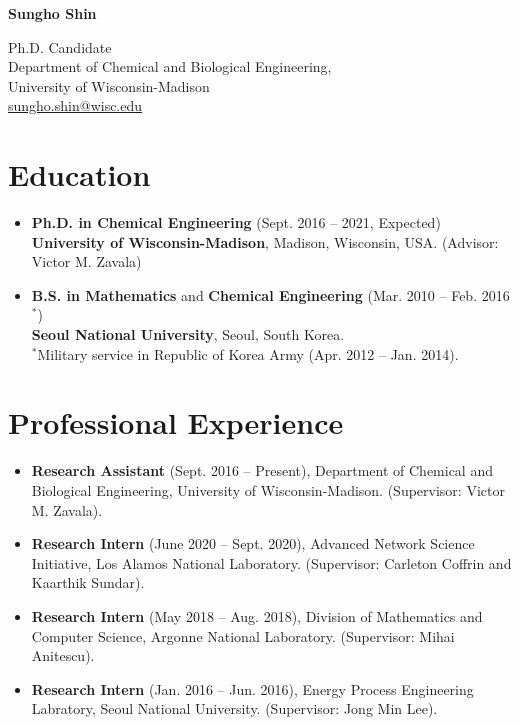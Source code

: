 \documentclass{article}
\begin{document}
\begin{center}
  {\bf\LARGE Sungho Shin}
\end{center}
\begin{center}
  {Ph.D. Candidate}\\
  {Department of Chemical and Biological Engineering},\\
  {University of Wisconsin-Madison}\\
  \href{mailto:sungho.shin@wisc.edu}{sungho.shin@wisc.edu}
\end{center}

\section*{Education}
\begin{itemize}[leftmargin=*]
\item[]{\bf Ph.D. in Chemical Engineering} (Sept. 2016 -- 2021, Expected)\\
  {\bf University of Wisconsin-Madison}, Madison, Wisconsin, USA. (Advisor: Victor M. Zavala)
\item[]{\bf B.S. in Mathematics} and {\bf Chemical Engineering} (Mar. 2010 -- Feb. 2016$^*$)\\
  {\bf Seoul National University}, Seoul, South Korea.\\
  $^*$Military service in Republic of Korea Army (Apr. 2012 -- Jan. 2014).
\end{itemize}

\section*{Professional Experience}
\begin{itemize}[leftmargin=*]
\item[] {\bf Research Assistant} (Sept. 2016 -- Present), Department of Chemical and Biological Engineering, University of Wisconsin-Madison. (Supervisor: Victor M. Zavala).
\item[] {\bf Research Intern} (June 2020 -- Sept. 2020), Advanced Network Science Initiative, Los Alamos National Laboratory. (Supervisor: Carleton Coffrin and Kaarthik Sundar).
\item[] {\bf Research Intern} (May 2018 -- Aug. 2018), Division of Mathematics and Computer Science, Argonne National Laboratory. (Supervisor: Mihai Anitescu).
\item[] {\bf Research Intern} (Jan. 2016 -- Jun. 2016), Energy Process Engineering Labratory, Seoul National University. (Supervisor: Jong Min Lee).
\end{itemize}
\end{document}
